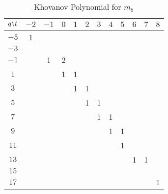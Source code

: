 \documentclass{article}
\theoremstyle{plain}
\begin{document}
        \begin{table}[H]
            \centering
            \begin{tabular}{| c | c | c | c | c | c | c | c | c | c | c | c |}
                \hline
                $q\symbol{92}t$&$-2$&$-1$&$0$&$1$&$2$&$3$&$4$&$5$&$6$&$7$&$8$\\
                \hline
                $-5$&1&&&&&&&&&&\\
                \hline
                $-3$&&&&&&&&&&&\\
                \hline
                $-1$&&1&2&&&&&&&&\\
                \hline
                $1$&&&1&1&&&&&&&\\
                \hline
                $3$&&&&1&1&&&&&&\\
                \hline
                $5$&&&&&1&1&&&&&\\
                \hline
                $7$&&&&&&1&1&&&&\\
                \hline
                $9$&&&&&&&1&1&&&\\
                \hline
                $11$&&&&&&&&1&&&\\
                \hline
                $13$&&&&&&&&&1&1&\\
                \hline
                $15$&&&&&&&&&&&\\
                \hline
                $17$&&&&&&&&&&&1\\
                \hline
            \end{tabular}
            \caption{Khovanov Polynomial for $m_{8}$}
            \label{table:m_8_kho}
        \end{table}
\end{document}
